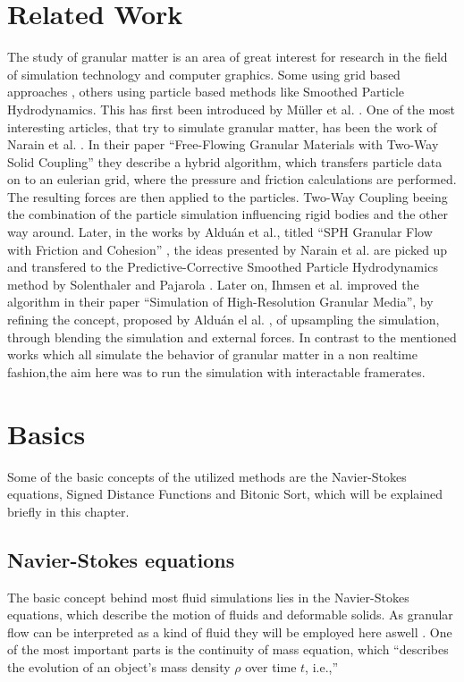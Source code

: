 \documentclass[intern]{cgMA}
\begin{document}
    \section{Related Work}\label{sec:related}
    The study of granular matter is an area of great interest for research in the field of simulation technology and computer graphics. Some using grid based approaches \cite{10.1145/1866158.1866195}, others using particle based methods like Smoothed Particle Hydrodynamics. This has first been introduced by Müller et al. \cite{10.5555/846276.846298}. 
    One of the most interesting articles, that try to simulate granular matter, has been the work of Narain et al. \cite{10.1145/1866158.1866195}. In their paper \enquote{Free-Flowing Granular Materials with Two-Way Solid Coupling}\cite{10.1145/1866158.1866195} they describe a hybrid algorithm, which transfers particle data on to an eulerian grid, where the pressure and friction calculations are performed. The resulting forces are then applied to the particles. Two-Way Coupling beeing the combination of the particle simulation influencing rigid bodies and the other way around. 
    Later, in the works by Alduán et al., titled \enquote{SPH Granular Flow with Friction and Cohesion} \cite{10.1145/2019406.2019410}, the ideas presented by Narain et al. \cite{10.1145/1866158.1866195} are picked up and transfered to the Predictive-Corrective Smoothed Particle Hydrodynamics method by Solenthaler and Pajarola \cite{10.1145/1576246.1531346}. Later on, Ihmsen et al. \cite{10.2312:PE:vriphys:vriphys12:053-060} improved the algorithm in their paper \enquote{Simulation of High-Resolution Granular Media}, by refining the concept, proposed by Alduán el al. \cite{10.2312:LocalChapterEvents:CEIG:CEIG09:011-018}, of upsampling the simulation, through blending the simulation and external forces.
    In contrast to the mentioned works which all simulate the behavior of granular matter in a non realtime fashion,the aim here was to run the simulation with interactable framerates.
    \pagebreak
    
    \section{Basics}\label{sec:basics}
    Some of the basic concepts of the utilized methods are the Navier-Stokes equations, Signed Distance Functions and Bitonic Sort, which will be explained briefly in this chapter.

    \subsection{Navier-Stokes equations}
    The basic concept behind most fluid simulations lies in the Navier-Stokes equations, which describe the motion of fluids and deformable solids. As granular flow can be interpreted as a kind of fluid they will be employed here aswell \cite{10.2312:PE:vriphys:vriphys12:053-060}. One of the most important parts is the continuity of mass equation, which \enquote{describes the evolution of an object's mass density $\rho$ over time $t$, i.e.,} \cite{survey_on_sph}
    
\end{document}
